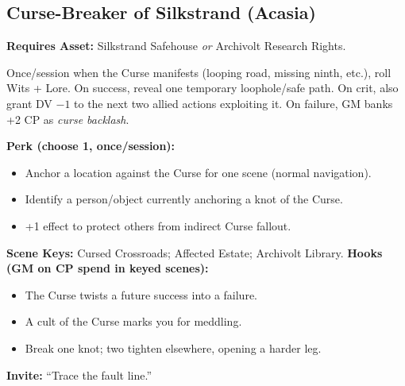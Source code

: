 \subsection{Curse-Breaker of Silkstrand (Acasia)}
\textbf{Requires Asset:} Silkstrand Safehouse \emph{or} Archivolt Research Rights.
\begin{tcolorbox}[enhanced,sharp corners,boxrule=.6pt,title={Talent — Follow the Unspooled Thread (7 XP)}]
Once/session when the Curse manifests (looping road, missing ninth, etc.), roll Wits + Lore. On success, reveal one temporary loophole/safe path. On crit, also grant DV $-1$ to the next two allied actions exploiting it. On failure, GM banks +2 CP as \emph{curse backlash}.
\end{tcolorbox}
\textbf{Perk (choose 1, once/session):}
\begin{itemize}
  \item Anchor a location against the Curse for one scene (normal navigation).
  \item Identify a person/object currently anchoring a knot of the Curse.
  \item +1 effect to protect others from indirect Curse fallout.
\end{itemize}
\textbf{Scene Keys:} Cursed Crossroads; Affected Estate; Archivolt Library.
\textbf{Hooks (GM on CP spend in keyed scenes):}
\begin{itemize}
  \item The Curse twists a future success into a failure.
  \item A cult of the Curse marks you for meddling.
  \item Break one knot; two tighten elsewhere, opening a harder leg.
\end{itemize}
\textbf{Invite:} “Trace the fault line.”

